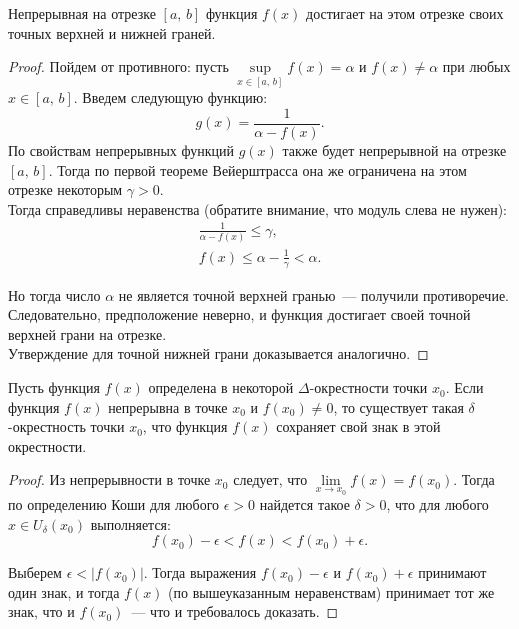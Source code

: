 \begin{theorem}
Непрерывная на отрезке \([a, \, b]\) функция \(f(x)\) достигает на этом отрезке
своих точных верхней и нижней граней.

\begin{proof}
Пойдем от противного: пусть \(\underset{x \in [a, \, b]}{\sup} f(x) = \alpha\) и
\(f(x) \neq \alpha\) при любых \(x \in [a, \, b]\).
Введем следующую функцию:
\[
g(x) = \frac{1}{\alpha - f(x)}.
\]
По свойствам непрерывных функций \(g(x)\) также будет непрерывной на отрезке \([a, \, b]\).
Тогда по первой теореме Вейерштрасса она же ограничена на этом отрезке некоторым \(\gamma > 0\). \\

Тогда справедливы неравенства (обратите внимание, что модуль слева не нужен):
\begin{gather}
    \frac{1}{\alpha - f(x)} \leq \gamma, \\
    f(x) \leq \alpha - \frac{1}{\gamma} < \alpha.
\end{gather}

Но тогда число \(\alpha\) не является точной верхней гранью~--- получили противоречие.
Следовательно, предположение неверно, и функция достигает своей точной верхней грани на отрезке. \\

Утверждение для точной нижней грани доказывается аналогично.
\end{proof}
\end{theorem}



\begin{lemma} \label{6:lemma_sign_preservation}
Пусть функция \(f(x)\) определена в некоторой \(\Delta\)-окрестности точки \(x_{0}\).
Если функция \(f(x)\) непрерывна в точке \(x_{0}\) и \(f(x_{0}) \neq 0\),
то существует такая \(\delta\)-окрестность точки \(x_{0}\),
что функция \(f(x)\) сохраняет свой знак в этой окрестности.

\begin{proof}
Из непрерывности в точке \(x_{0}\) следует, что \(\lim\limits_{x \to x_{0}} f(x) = f(x_{0})\).
Тогда по определению Коши для любого \(\epsilon > 0\) найдется такое \(\delta > 0\),
что для любого \(x \in U_{\delta}(x_{0})\) выполняется:
\[
f(x_{0}) - \epsilon < f(x) < f(x_{0}) + \epsilon.
\]

Выберем \(\epsilon < |f(x_{0})|\). Тогда выражения \(f(x_{0}) - \epsilon\)
и \(f(x_{0}) + \epsilon\) принимают один знак, и тогда \(f(x)\) (по вышеуказанным неравенствам)
принимает тот же знак, что и \(f(x_{0})\)~--- что и требовалось доказать.
\end{proof}
\end{lemma}

